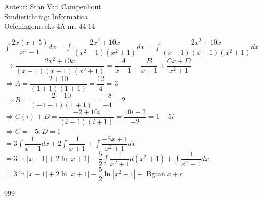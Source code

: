\documentclass[a4paper]{article}
\begin{document}
  
\noindent \large Auteur: Stan Van Campenhout \\
\noindent \large Studierichting:  Informatica\\
\noindent \large Oefeningenreeks 4A nr. 44.14\\

\medskip

\normalsize

$ \displaystyle\int\dfrac{2x\left(x+5\right)}{x^4-1}dx = \displaystyle\int\dfrac{2x^2+10x}{\left(x^2-1\right)\left(x^2+1\right)}dx
= \displaystyle\int\dfrac{2x^2+10x}{\left(x-1\right)\left(x+1\right)\left(x^2+1\right)}dx $\\

$ \rightarrow \dfrac{2x^2+10x}{\left(x-1\right)\left(x+1\right)\left(x^2+1\right)} = \dfrac{A}{x-1} + \dfrac{B}{x+1} + \dfrac{Cx + D}{x^2 +1} $\\

$ \Rightarrow A = \dfrac{2 + 10}{\left(1+1\right)\left(1+1\right)} = \dfrac{12}{4} = 3 $\\

$ \Rightarrow B = \dfrac{2 - 10}{\left(-1-1\right)\left(1+1\right)} = \dfrac{-8}{-4} = 2 $\\

$ \Rightarrow C\left(i\right) + D = \dfrac{-2+10i}{\left(i-1\right)\left(i+1\right)} = \dfrac{10i - 2}{-2} = 1 - 5i $\\

$ \Rightarrow C = -5, D = 1 $\\

$ = 3\displaystyle\int\dfrac{1}{x-1}dx + 2\displaystyle\int\dfrac{1}{x+1} + \displaystyle\int\dfrac{-5x + 1}{x^2 + 1}dx $\\

$ = 3\ln|x-1| + 2\ln|x+1| - \dfrac{5}{2}\displaystyle\int\dfrac{1}{x^2+1}d\left(x^2 + 1\right) + \displaystyle\int\dfrac{1}{x^2+1}dx $\\

$ = 3\ln|x-1| + 2\ln|x+1| - \dfrac{5}{2}\ln|x^2+1| + \operatorname{Bgtan}x + c $\\

\begin{thebibliography}{999}
\end{thebibliography}
\end{document}

